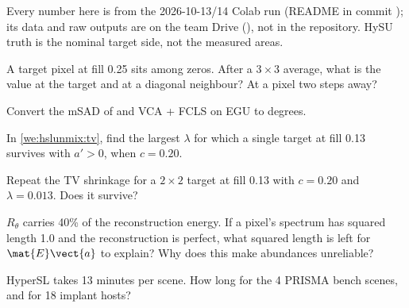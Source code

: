\begin{drift}
Every number here is from the 2026-10-13/14 Colab run (README in commit ); its data and raw outputs are on the
team Drive (), not in the repository. HySU truth is the nominal target side, not
the measured areas.
\end{drift}

\begin{confusions}
\end{confusions}

\begin{checkyourself}
\item\label{ex:hslunmix:1} A target pixel at fill 0.25 sits among zeros. After a $3\times3$ average, what is the value at the
  target and at a diagonal neighbour? At a pixel two steps away?
\item\label{ex:hslunmix:2} Convert the mSAD of  and VCA + FCLS on EGU to degrees.
\item\label{ex:hslunmix:3} In \cref{we:hslunmix:tv}, find the largest $\lambda$ for which a single target at fill 0.13 survives
  with $a'>0$, when $c=0.20$.
\item\label{ex:hslunmix:4} Repeat the TV shrinkage for a $2\times2$ target at fill 0.13 with $c=0.20$ and $\lambda=0.013$. Does
  it survive?
\item\label{ex:hslunmix:5} $R_\theta$ carries 40\% of the reconstruction energy. If a pixel's spectrum has squared length 1.0
  and the reconstruction is perfect, what squared length is left for $\mat{E}\vect{a}$ to explain? Why does this make
  abundances unreliable?
\item\label{ex:hslunmix:6} HyperSL takes 13 minutes per scene. How long for the 4 PRISMA bench scenes, and for 18 implant hosts?
\end{checkyourself}

